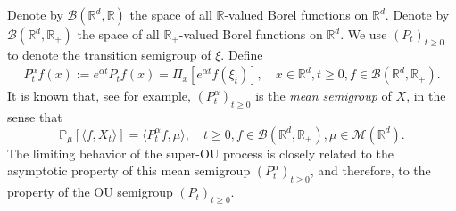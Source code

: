 \documentclass[12pt,a4paper]{amsart}
\theoremstyle{plain}
\theoremstyle{definition}
\numberwithin{equation}{section}
\begin{document}
Denote by $\mathcal B(\mathbb R^d, \mathbb R)$ the space of all $\mathbb R$-valued Borel functions on $\mathbb R^d$.
Denote by $\mathcal B(\mathbb R^d, \mathbb R_+)$ the space of all $\mathbb R_+$-valued Borel functions on $\mathbb R^d$.
We use  $(P_t)_{t\geq 0}$ to denote the transition semigroup of $\xi$.	
Define
\begin{align}
  \label{eq: meansemigroup}
  P^{\alpha}_t f(x)
  :=
  e^{\alpha t} P_t f(x) 
  = \Pi_x [e^{\alpha t}f(\xi_t)]
  , \quad x\in \mathbb R^d,t\geq 0, f\in \mathcal B(\mathbb R^d, \mathbb R_+).
\end{align}
It is known that, see \cite[Proposition 2.27]{Li2011Measure-valued} for example, $(P^\alpha_t)_{t\geq 0}$ is the \emph{mean semigroup} of $X$, in the sense that
\begin{equation}
  \mathbb{P}_{\mu}[\langle f, X_t \rangle]
  = \langle P^\alpha_t f, \mu \rangle,
  \quad t\geq 0, f\in \mathcal B(\mathbb R^d, \mathbb R_+), \mu \in \mathcal M(\mathbb R^d).
\end{equation}
The limiting behavior of the super-OU process is closely related to the asymptotic property of this mean semigroup $(P^\alpha_t)_{t\geq 0}$, and therefore, to the property of the OU semigroup $(P_t)_{t\geq 0}$.
\end{document}
